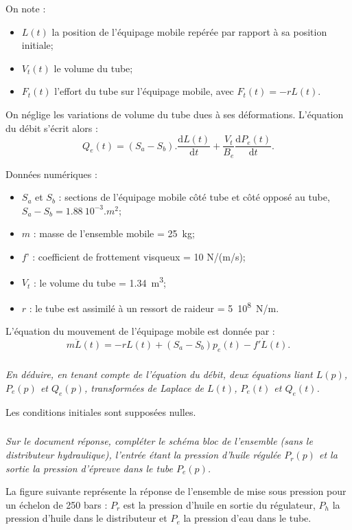 \documentclass[10pt,fleqn]{article} %
\begin{document}
\begin{multicols}{2}
On note :
\begin{itemize}
	\item $L(t)$ la position de l’équipage mobile repérée par rapport à sa position initiale;
	\item $V_t(t)$ le volume du tube;
	\item $F_t(t)$ l’effort du tube sur l’équipage mobile, avec $F_t(t) = - rL(t)$.
\end{itemize}

On néglige les variations de volume du tube dues à ses déformations. L’équation du débit s’écrit alors :
	$$Q_e (t)=(S_a-S_b ).\dfrac{\text{d}L(t)}{\text{d}t}+\dfrac{V_t}{B_e}  \dfrac{\text{d}P_e (t)}{\text{d}t}.$$
	
	
Données numériques :
\begin{itemize}
	\item $S_a$ et $S_b$ :	sections de l’équipage mobile côté tube et côté opposé au tube,
$S_a -S_b  = \SI{1,88}{10^{-3}.m^2}$;	
	\item $m$ :		masse de l’ensemble mobile = \SI{25}{kg};
	\item $f ’$ :		coefficient de frottement visqueux = 10 N/(m/s);
	\item $V_t$ :		le volume du tube = \SI{1,34}{m^3};
	\item $r$ :		le tube est assimilé à un ressort de raideur = \SI{5}{10^8.N/m}.
\end{itemize}


L’équation du mouvement de l’équipage mobile est donnée par : 
$$
m\ddot{L}(t)=-rL(t)+\left(S_a-S_b \right)p_e(t)-f'\dot{L}(t).
$$

\subparagraph{}
\textit{En déduire, en tenant compte de l’équation du débit, deux équations liant $L(p)$, $P_e(p)$ et $Q_e(p)$, transformées de Laplace de $L(t)$, $P_e(t)$ et $Q_e(t)$. }

Les conditions initiales sont supposées nulles.

\subparagraph{}
\textit{Sur le document réponse, compléter le schéma bloc de l’ensemble (sans le distributeur hydraulique), l’entrée étant la pression d’huile régulée $P_r(p)$ et la sortie la pression d’épreuve dans le tube $P_e(p)$.}



La figure suivante représente la réponse de l’ensemble de mise sous pression pour un échelon de 250 bars : $P_r$ est la pression d’huile en sortie du régulateur, $P_h$ la pression d’huile dans le distributeur et $P_e$ la pression d’eau dans le tube.


\end{multicols}
\end{document}
